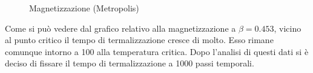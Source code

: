 \begin{figure}[h]
\caption{Magnetizzazione  (Metropolis)}
\end{figure}
Come si può vedere dal grafico relativo alla magnetizzazione a $\beta=0.453$, vicino al punto critico il tempo di termalizzazione cresce di molto. Esso rimane comunque intorno a 100 alla temperatura critica.
Dopo l'analisi di questi dati si è deciso di fissare il tempo di termalizzazione a 1000 passi temporali.
